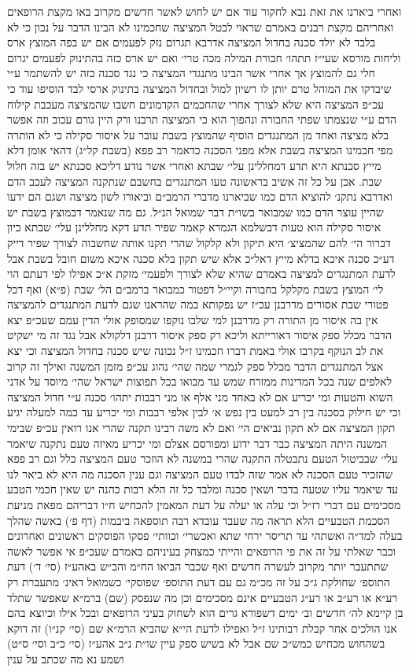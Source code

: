 \documentclass[12pt, openany]{book}
\begin{document}
\begin{multicols}{2}
ואחרי ביארנו את זאת נבא לחקור עוד אם יש לחוש לאשר חדשים מקרוב באו מקצת הרופאים ואחריהם מקצת רבנים באמרם שראוי לבטל המציצה שחכמינו לא הבינו הדבר על נכון כי לא בלבד לא יולד סכנה בחדול המציצה אדרבא תגרום נזק לפעמים אם יש בפה המוצץ ארס וליחות מורסא שעי״ז תתהו׳ חבורת המילה מכה טרי׳ ואם יש ארס כזה בהתינוק לפעמים יגרום חלי גם להמוצץ אך אחרי אשר הבינו מתנגדי המציצה כי נגד סכנה כזה יש להשתמר ע״י שיבדקו את המוהל טרם יותן לו רשיון למול ובחדול המציצה בתינוק ארסי לבד הוסיפו עוד כי עכ״פ המציצה היא שלא לצורך אחרי שהחכמים הקדמונים חשבו שהמציצה מעכבת קילוח הדם ע״י שנצמתו שפתי החבורה ונהפוך הוא כי המציצה תרבנו ורק היין גורם עכוב וזה אפשר בלא מציצה ואחד מן המתנגדים הוסיף שהמוצץ בשבת עובר על איסור סקילה כי לא הותרה מפי חכמינו המציצה בשבת אלא מפני הסכנה כדאמר רב פפא (בשבת קל״ג) דהאי אומן דלא מייץ סכנתא היא תדע דמחללינן עלי׳ שבתא ואחרי אשר נודע דליכא סכנתא יש בזה חלול שבת. אכן על כל זה אשיב בראשונה טעו המתנגדים בחשבם שנתקנה המציצה לעכב הדם ואדרבא נתקנ׳ להוציא הדם כמו שביארנו מדברי הרמב״ם וביאורו לשון מציצה ושגם הם ידעו שהיין עוצר הדם כמו שמבואר בשו״ת דבר שמואל הנ״ל. גם מה שנאמר דבמוצץ בשבת יש איסור סקילה הוא טעות דבשלמא הגמרא קאמר שפיר תדע דקא מחללינן עלי׳ שבתא כיון דברור הי׳ להם שהמציצ׳ היא תיקון ולא קלקול שהרי תקנו אותה שחשבוה לצורך שפיר דייק דע״כ סכנה איכא בדלא מייץ דאל״כ אלא שיש תקון בלא סכנה איכא משום חובל בשבת אבל לדעת המתנגדים למציצה באמרם שהיא שלא לצורך ולפעמי׳ מזקת א״כ אפילו לפי דעתם הוי לי׳ המוצץ בשבת מקלקל בחבורה וקיי״ל דפטור כמבואר ברמב״ם הל׳ שבת (פ״א) ואף דכל פטורי שבת אסורים מדרבנן עכ״ז יש נפקותא במה שהראנו שגם לדעת המתנגדים להמציצה אין בה איסור מן התורה רק מדרבנן למי שלבו נוקפו שמסופק אולי הדין עמם שעכ״פ יצא הדבר מכלל ספק איסור דאורייתא וליכא רק ספק איסור דרבנן דלקולא אבל נגד זה מי ישקיט את לב הנוקף בקרבו אולי באמת דברו חכמינו ז״ל נכונה שיש סכנה בחדול המציצה וכי יצא אצל המתנגדים הדבר מכלל ספק לגמרי שמה שהי׳ נהוג עכ״פ מזמן המשנה ואילך זה קרוב לאלפים שנה בכל המדינות ממזרח שמש עד מבואו בכל תפוצות ישראל שהי׳ מיוסד על אדני השוא והטעות ומי יכריע אם לא באחד מני אלף או מני רבבות יתהו׳ סכנה ע״י חדול המציצה וכי יש חילוק בסכנה בין רב למעט בין נפש א׳ לבין אלפי רבבות ומי יכריע עד כמה למעלה יגיע תקון המציצה אם לא תקון נביאים הי׳ ואם לא משה רבינו תקנה שהרי אנו רואין עכ״פ שבימי המשנה היתה המציצה כבר דבר ידוע ומפורסם אצלם ומי יכריע מאיזה טעם נתקנה שיאמר עלי׳ שבביטול הטעם נתבטלה התקנה שהרי במשנה לא הוזכר טעם המציצה כלל וגם רב פפא שהזכיר טעם הסכנה לא אמר שזה לבדו טעם המציצה וגם ענין הסכנה מה היא לא ביאר לנו עד שיאמר עליו שטעה בדבר ושאין סכנה ומלבד כל זה הלא רבות כהנה יש שאין חכמי הטבע מסכימים עם דברי רז״ל וכי עלה או יעלה על דעת המאמין להכחיש ח״ו דבריהם מפאת מניעת הסכמת הטבעיים הלא תראה מה שעבד עובדא רבה תוספאה ביבמות (דף פ׳) באשה שהלך בעלה למד״ה ואשתהי עד תריסר ירחי שתא ואכשרי׳ וכוותי׳ פסקו הפוסקים ראשונים ואחרונים וכבר שאלתי על זה את פי הרופאים והייתי כמצחק בעיניהם באמרם שעכ״פ אי אפשר לאשה שתתעבר יותר מקרוב לעשרה חדשים ואף שכבר הביאו הח״מ והב״ש באהע״ז (סי׳ ד׳) דעת התוספ׳ שחולקת ג״כ על זה מכ״מ גם עם דעת התוספ׳ שפוסקי׳ כשמואל דאינ׳ מתעברת רק רע״א או רע״ב או רע״ג הטבעיים אינם מסכימים וכן מה שנפסק (שם) ברמ״א שאפשר שתלד בן קיימא לה׳ חדשים וב׳ ימים דשפורא גרים הוא לשחוק בעיני הרופאים ובכל אילו וכיוצא בהם אנו הולכים אחר קבלת רבותינו ז״ל ואפילו לדעת הי״א שהביא הרמ״א שם (סי׳ קנ״ו) זה דוקא בשהחוש מכחיש כמש״כ שם אבל לא בשיש ספק עיין שו״ת נ״ב אהע״ז (סי׳ כ״ב וסי׳ ס״ט) ושמע נא מה שכתב על ענין 
\end{multicols}
\end{document}
